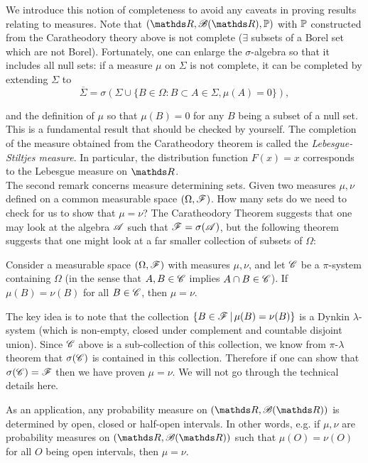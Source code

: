 We introduce this notion of completeness to avoid any caveats in proving results relating to measures. Note that $(\R, \B(\R), \p)$ with $\mathbb{P}$ constructed from the Caratheodory theory above is not complete ($\exists$ subsets of a Borel set which are not Borel). Fortunately, one can enlarge the $\sigma$-algebra so that it includes all null sets: if a measure $\mu$ on $\Sigma$ is not complete, it can be completed by extending $\Sigma$ to 
\begin{equation*}
    \overline{\Sigma} = \sigma(\Sigma \cup \{ B \in \Omega : B \subset A \in \Sigma, \mu(A) = 0 \}),
\end{equation*}

and the definition of $\mu$ so that $\mu(B) = 0$ for any $B$ being a subset of a null set. This is a fundamental result that should be checked by yourself. The completion of the measure obtained from the Caratheodory theorem is called the \textit{Lebesgue-Stiltjes measure}. In particular, the distribution function $F(x) = x$ corresponds to the Lebesgue measure on $\R$.\\

The second remark concerns measure determining sets. Given two measures $\mu, \nu$ defined on a common measurable space $(\Omega,\mathcal{F})$. How many sets do we need to check for us to show that $\mu = \nu$? The Caratheodory Theorem suggests that one may look at the algebra $\mathcal{A}$ such that $\mathcal{F} = \sigma(\mathcal{A})$, but the following theorem suggests that one might look at a far smaller collection of subsets of $\Omega$: 

\begin{theorem} \label{thm:measure_determining}
Consider a measurable space $(\Omega,\mathcal{F})$ with measures $\mu, \nu$, and let $\mathcal{C}$ be a $\pi$-system containing $\Omega$ (in the sense that $A, B \in \mathcal{C}$ implies $A \cap B \in \mathcal{C}$). If $\mu(B) = \nu(B)$ for all $B \in \mathcal{C}$, then $\mu = \nu$.
\end{theorem}

The key idea is to note that the collection $\left\{ B \in \mathcal{F} \,|\, \mu(B) = \nu(B) \right \}$ is a Dynkin $\lambda$-system (which is non-empty, closed under complement and countable disjoint union). Since $\mathcal{C}$ above is a sub-collection of this collection, we know from $\pi$-$\lambda$ theorem that $\sigma(\mathcal{C})$ is contained in this collection. Therefore if one can show that $\sigma(\mathcal{C}) = \mathcal{F}$ then we have proven $\mu = \nu$. We will not go through the technical details here.

\begin{example} \label{eg:measures_determined_by_open_closed_sets}
As an application, any probability measure on $(\R,\B(\R))$ is determined by open, closed or half-open intervals. In other words, e.g. if $\mu, \nu$ are probability measures on $(\R,\B(\R))$ such that $\mu(O) = \nu(O)$ for all $O$ being open intervals, then $\mu = \nu$.
\end{example}

